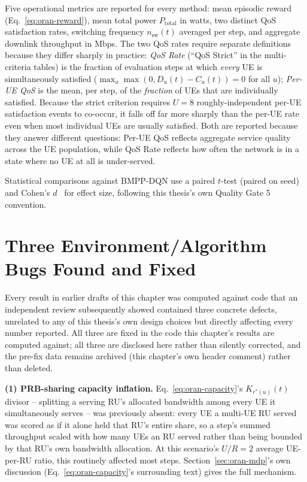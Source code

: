Five operational metrics are reported for every method: mean episodic
reward (Eq.~\ref{eq:oran-reward}), mean total power $P_{\mathrm{total}}$ in
watts, two distinct QoS satisfaction rates, switching frequency
$n_{\mathrm{sw}}(t)$ averaged per step, and aggregate downlink throughput in
Mbps. The two QoS rates require separate definitions because they differ
sharply in practice: \emph{QoS Rate} (``QoS Strict'' in the multi-criteria
tables) is the fraction of evaluation steps at which \emph{every} UE is
simultaneously satisfied ($\max_u \max(0, D_u(t)-C_u(t)) = 0$ for all $u$);
\emph{Per-UE QoS} is the mean, per step, of the \emph{fraction} of UEs that
are individually satisfied. Because the strict criterion requires $U=8$
roughly-independent per-UE satisfaction events to co-occur, it falls off far
more sharply than the per-UE rate even when most individual UEs are usually
satisfied. Both are reported because they answer different questions:
Per-UE QoS reflects aggregate service quality across the UE population,
while QoS Rate reflects how often the network is in a state where no UE at
all is under-served.

Statistical comparisons against BMPP-DQN use a paired $t$-test (paired on
seed) and Cohen's $d$~\cite{cohen1988statistical} for effect size, following this thesis's own Quality
Gate 5 convention.

\section{Three Environment/Algorithm Bugs Found and Fixed}
\label{sec:oran-bugfixes}

Every result in earlier drafts of this chapter was computed against code
that an independent review subsequently showed contained three concrete
defects, unrelated to any of this thesis's own design choices but
directly affecting every number reported. All three are fixed in the code
this chapter's results are computed against; all three are disclosed here
rather than silently corrected, and the pre-fix data remains archived
(this chapter's own header comment) rather than deleted.

\textbf{(1) PRB-sharing capacity inflation.} Eq.~\ref{eq:oran-capacity}'s
$K_{r^*(u)}(t)$ divisor -- splitting a serving RU's allocated bandwidth
among every UE it simultaneously serves -- was previously absent: every
UE a multi-UE RU served was scored as if it alone held that RU's entire
share, so a step's summed throughput scaled with how many UEs an RU
served rather than being bounded by that RU's own bandwidth allocation.
At this scenario's $U/R=2$ average UE-per-RU ratio, this routinely
affected most steps. Section~\ref{sec:oran-mdp}'s own
discussion (Eq.~\ref{eq:oran-capacity}'s surrounding text) gives the full
mechanism.

